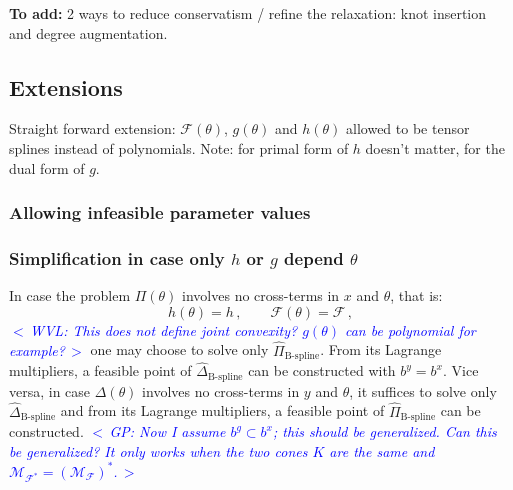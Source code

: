 \documentclass{article}
\DeclareMathOperator*{\minimize}{minimize}
\DeclareMathOperator*{\subj}{subject\;to}
\newcommand{\commentGP}[1]{\noindent \textcolor{blue}{\emph{$<\,$GP: #1$\,>$}}}%
\newcommand{\commentWVL}[1]{\noindent \textcolor{blue}{\emph{$<\,$WVL: #1$\,>$}}}%
\newcommand{\adj}{\ast}                     %
\newcommand{\ppar}{\theta}                          %
\newcommand{\Ppar}{{\bm{\theta}}}                   %
\newcommand{\X}{\mathbf{X}}                         %
\newcommand{\calF}{\mathcal{F}}                     %
\newcommand{\cx}{\textsf{x}}        %
\newcommand{\Alpha}{\bm{\alpha}}    %
\newcommand{\cg}{\textsf{g}}            %
\newcommand{\calMF}{\mathcal{M}_{\mathcal{F}}}
\newcommand{\calMFadj}{\mathcal{M}_{\mathcal{F}^\adj}}
\begin{document}
\noindent \textbf{To add:} 2 ways to reduce conservatism / refine the relaxation: knot insertion and degree augmentation.


%



\subsection{Extensions}\label{subsec:extensions}

Straight forward extension: $\calF(\ppar)$, $g(\ppar)$ and $h(\ppar)$ allowed to be tensor splines instead of polynomials. Note: for primal form of $h$ doesn't matter, for the dual form of $g$.


\subsubsection{Allowing infeasible parameter values}%

\subsubsection{Simplification in case only $h$ or $g$ depend $\ppar$}%
In case the problem $\Pi(\ppar)$ involves no cross-terms in $x$ and $\ppar$, that is:
\[ h(\ppar) = h\,,\qquad \calF(\ppar) = \calF\,,
\]
\commentWVL{This does not define joint convexity? $g(\ppar)$ can be polynomial
for example?}
one may choose to solve only $\hat{\Pi}_\text{B-spline}$. From its Lagrange multipliers, a feasible point of $\hat{\Delta}_\text{B-spline}$ can be constructed with $b^y=b^x$. Vice versa, in case $\Delta(\ppar)$ involves no cross-terms in $y$ and $\ppar$, it suffices to solve only $\hat{\Delta}_\text{B-spline}$ and from its Lagrange multipliers, a feasible point of $\hat{\Pi}_\text{B-spline}$ can be constructed. \commentGP{Now I assume $b^g\subset b^x$; this should be generalized. Can this be generalized? It only works when the two cones $K$ are the same and $\calMFadj=(\calMF)^\adj$.}
\end{document}
